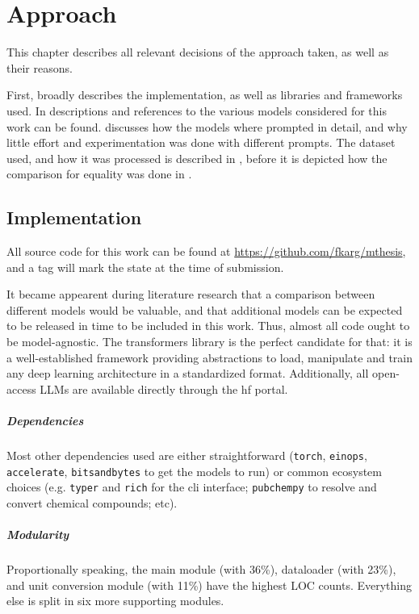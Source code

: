 \chapter{Approach}\label{chap:approach}
This chapter describes all relevant decisions of the approach taken, as well as their reasons.

First,  broadly describes the implementation, as well as libraries and frameworks used.
In  descriptions and references to the various models considered for this work can be found.
 discusses how the models where prompted in detail, and why little effort and experimentation was done with different prompts.
The dataset used, and how it was processed is described in , before it is depicted how the comparison for equality was done in .


\section{Implementation}\label{sec:impl}
All source code for this work can be found at \url{https://github.com/fkarg/mthesis}, and a tag will mark the state at the time of submission.

It became appearent during literature research that a comparison between different models would be valuable, and that additional models can be expected to be released in time to be included in this work.
Thus, almost all code ought to be model-agnostic.
The \acrlong{transformers} library is the perfect candidate for that: it is a well-established framework providing abstractions to load, manipulate and train any deep learning architecture in a standardized format.
Additionally, all open-access \glspl{LLM} are available directly through the \gls{hf} portal.

\paragraph{Dependencies}
Most other dependencies used are either straightforward (\texttt{torch}, \texttt{einops}, \texttt{accelerate}, \texttt{bitsandbytes} to get the models to run) or common ecosystem choices (e.g. \texttt{typer} and \texttt{rich} for the cli interface; \texttt{pubchempy} to resolve and convert chemical compounds; etc).

\paragraph{Modularity}
Proportionally speaking, the main module (with 36\%), dataloader (with 23\%), and unit conversion module (with 11\%) have the highest \gls{LOC} counts. Everything else is split in six more supporting modules.


